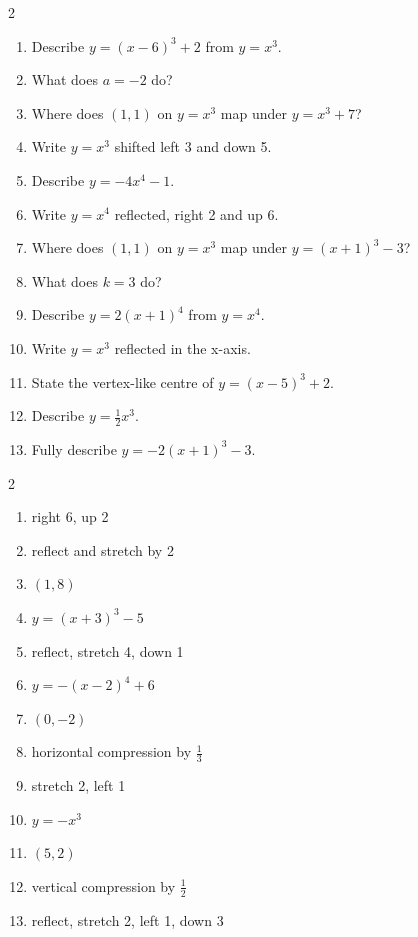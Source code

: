 \documentclass[11pt]{article}
\begin{document}
\clearpage
{}

\begin{recapbox}
\begin{multicols}{2}
\small
\begin{enumerate}[leftmargin=*,itemsep=3pt]
  \item Describe $y=(x-6)^3+2$ from $y=x^3$.
  \item What does $a=-2$ do?
  \item Where does $(1,1)$ on $y=x^3$ map under $y=x^3+7$?
  \item Write $y=x^3$ shifted left 3 and down 5.
  \item Describe $y=-4x^4-1$.
  \item Write $y=x^4$ reflected, right 2 and up 6.
  \item Where does $(1,1)$ on $y=x^3$ map under $y=(x+1)^3-3$?
  \item What does $k=3$ do?
  \item Describe $y=2(x+1)^4$ from $y=x^4$.
  \item Write $y=x^3$ reflected in the x-axis.
  \item State the vertex-like centre of $y=(x-5)^3+2$.
  \item Describe $y=\tfrac12 x^3$.
  \item Fully describe $y=-2(x+1)^3-3$.
\end{enumerate}
\end{multicols}
\end{recapbox}

\begin{keybox}
\begin{multicols}{2}
\small
\begin{enumerate}[leftmargin=*,itemsep=3pt]
  \item right 6, up 2
  \item reflect and stretch by 2
  \item $(1,8)$
  \item $y=(x+3)^3-5$
  \item reflect, stretch 4, down 1
  \item $y=-(x-2)^4+6$
  \item $(0,-2)$
  \item horizontal compression by $\tfrac13$
  \item stretch 2, left 1
  \item $y=-x^3$
  \item $(5,2)$
  \item vertical compression by $\tfrac12$
  \item reflect, stretch 2, left 1, down 3
\end{enumerate}
\end{multicols}
\end{keybox}
\end{document}
